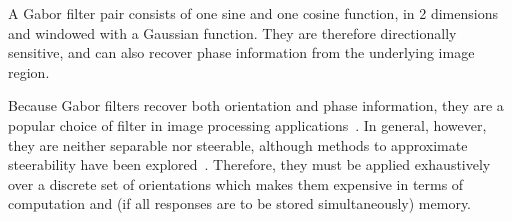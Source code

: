 A Gabor filter pair consists of one sine and one cosine function, in 2 dimensions and windowed with a Gaussian function. They are therefore directionally sensitive, and can also recover phase information from the underlying image region.

Because Gabor filters recover both orientation and phase information, they are a popular choice of filter in image processing applications~\cite{Daugman_TASSP88}. In general, however, they are neither separable nor steerable, although methods to approximate steerability have been explored~\cite{Teo_1987,Perona_PAMI95}. Therefore, they must be applied exhaustively over a discrete set of orientations which makes them expensive in terms of computation and (if all responses are to be stored simultaneously) memory.